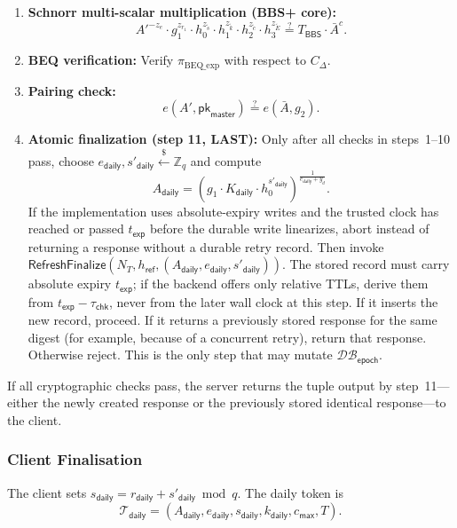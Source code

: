 \documentclass[11pt]{article}
\theoremstyle{definitionstyle}
\theoremstyle{plain}
\newcommand{\DB}{\mathcal{DB}}
\begin{document}
\begin{enumerate}[leftmargin=*]
\begin{align*}
    z_{\tilde{c}} \cdot h_4 + z_u \cdot h_1 + z_{r_1} \cdot T \cdot h_2 + z_v \cdot h_0 - T_D &\stackrel{?}{=} z_{r_1} \cdot K_{\mathsf{daily}} - T_{\mathsf{scale},D}, \\
    z_{\tilde{E}} \cdot h_3 + z_w \cdot h_0 - T_B &\stackrel{?}{=} z_{r_1} \cdot C_{\mathsf{bridge}} - T_{\mathsf{scale},B}.
  \end{align*}
\item \textbf{Schnorr multi-scalar multiplication (BBS+ core):}
  \[
  A'^{-z_e} \cdot g_1^{z_{r_1}} \cdot h_0^{z_{\tilde{s}}} \cdot h_1^{z_{\tilde{k}}} \cdot h_2^{z_{\tilde{c}}} \cdot h_3^{z_{\tilde{E}}} \stackrel{?}{=} T_{\mathsf{BBS}} \cdot \bar{A}^c.
  \]
\item \textbf{BEQ verification:} Verify $\pi_{\text{BEQ\_exp}}$ with respect to $C_{\Delta}$.
\item \textbf{Pairing check:}
  \[
  e(A', \mathsf{pk}_{\mathsf{master}}) \stackrel{?}{=} e(\bar{A}, g_2).
  \]
\item \textbf{Atomic finalization (step 11, LAST):} Only after all checks in steps~1--10 pass, choose $e_{\mathsf{daily}}, s'_{\mathsf{daily}} \xleftarrow{\$} \mathbb{Z}_q$ and compute
  \[
  A_{\mathsf{daily}} = \left( g_1 \cdot K_{\mathsf{daily}} \cdot h_0^{s'_{\mathsf{daily}}} \right)^{\frac{1}{e_{\mathsf{daily}} + y_d}}.
  \]
  If the implementation uses absolute-expiry writes and the trusted clock has reached or passed $t_{\mathsf{exp}}$ before the durable write linearizes, abort instead of returning a response without a durable retry record. Then invoke $\mathsf{RefreshFinalize}(N_T, h_{\mathsf{ref}}, (A_{\mathsf{daily}}, e_{\mathsf{daily}}, s'_{\mathsf{daily}}))$. The stored record must carry absolute expiry $t_{\mathsf{exp}}$; if the backend offers only relative TTLs, derive them from $t_{\mathsf{exp}}-\tau_{\mathsf{chk}}$, never from the later wall clock at this step. If it inserts the new record, proceed. If it returns a previously stored response for the same digest (for example, because of a concurrent retry), return that response. Otherwise reject. This is the only step that may mutate $\DB_{\mathsf{epoch}}$.
\end{enumerate}

If all cryptographic checks pass, the server returns the tuple output by step~11---either the newly created response or the previously stored identical response---to the client.

\subsubsection{Client Finalisation}
The client sets $s_{\mathsf{daily}} = r_{\mathsf{daily}} + s'_{\mathsf{daily}} \bmod q$. The daily token is
\[
\mathcal{T}_{\mathsf{daily}} = (A_{\mathsf{daily}}, e_{\mathsf{daily}}, s_{\mathsf{daily}}, k_{\mathsf{daily}}, c_{\mathsf{max}}, T).
\]
\end{document}
